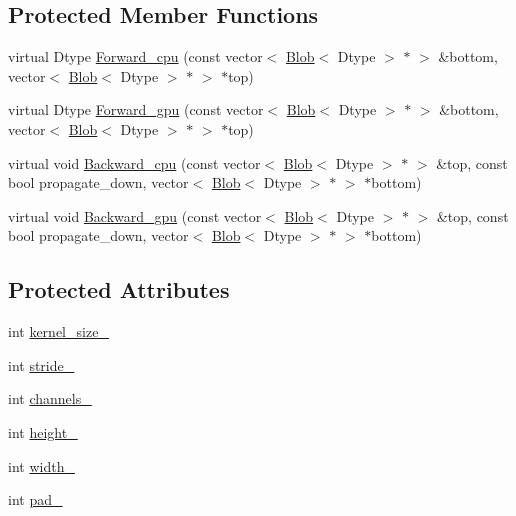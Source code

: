 \subsection*{Protected Member Functions}
\begin{DoxyCompactItemize}
\item 
virtual Dtype \hyperlink{classcaffe_1_1_im2col_layer_a635af15bcfdf2ec96913d75de5763328}{Forward\+\_\+cpu} (const vector$<$ \hyperlink{classcaffe_1_1_blob}{Blob}$<$ Dtype $>$ $\ast$ $>$ \&bottom, vector$<$ \hyperlink{classcaffe_1_1_blob}{Blob}$<$ Dtype $>$ $\ast$ $>$ $\ast$top)
\item 
virtual Dtype \hyperlink{classcaffe_1_1_im2col_layer_af60c215a0953742dc1ca2163f55bd9a7}{Forward\+\_\+gpu} (const vector$<$ \hyperlink{classcaffe_1_1_blob}{Blob}$<$ Dtype $>$ $\ast$ $>$ \&bottom, vector$<$ \hyperlink{classcaffe_1_1_blob}{Blob}$<$ Dtype $>$ $\ast$ $>$ $\ast$top)
\item 
virtual void \hyperlink{classcaffe_1_1_im2col_layer_ae6436f4287c23e62965f7c8216669ef2}{Backward\+\_\+cpu} (const vector$<$ \hyperlink{classcaffe_1_1_blob}{Blob}$<$ Dtype $>$ $\ast$ $>$ \&top, const bool propagate\+\_\+down, vector$<$ \hyperlink{classcaffe_1_1_blob}{Blob}$<$ Dtype $>$ $\ast$ $>$ $\ast$bottom)
\item 
virtual void \hyperlink{classcaffe_1_1_im2col_layer_abe4feb385c1226f2d69ec47142ce0b06}{Backward\+\_\+gpu} (const vector$<$ \hyperlink{classcaffe_1_1_blob}{Blob}$<$ Dtype $>$ $\ast$ $>$ \&top, const bool propagate\+\_\+down, vector$<$ \hyperlink{classcaffe_1_1_blob}{Blob}$<$ Dtype $>$ $\ast$ $>$ $\ast$bottom)
\end{DoxyCompactItemize}
\subsection*{Protected Attributes}
\begin{DoxyCompactItemize}
\item 
int \hyperlink{classcaffe_1_1_im2col_layer_af4cb2dc9a9691d840dc5b18ddca5f3f3}{kernel\+\_\+size\+\_\+}
\item 
int \hyperlink{classcaffe_1_1_im2col_layer_a03923aa2de104271d4df535316871b3b}{stride\+\_\+}
\item 
int \hyperlink{classcaffe_1_1_im2col_layer_a819581a35ffba22f5df2c0340210c2e9}{channels\+\_\+}
\item 
int \hyperlink{classcaffe_1_1_im2col_layer_ade34e2397b55eb5687a32c9e59137ca9}{height\+\_\+}
\item 
int \hyperlink{classcaffe_1_1_im2col_layer_a6d888c45c786826e1acabd97213e45a6}{width\+\_\+}
\item 
int \hyperlink{classcaffe_1_1_im2col_layer_a37ed956e35a1b04a3c0da7363aa9ea1f}{pad\+\_\+}
\end{DoxyCompactItemize}


